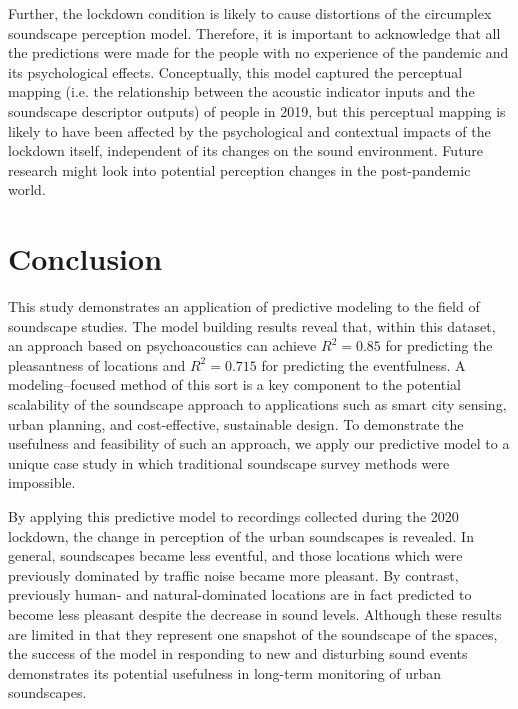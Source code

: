 Further, the lockdown condition is likely to cause distortions of the circumplex soundscape perception model. Therefore, it is important to acknowledge that all the predictions were made for the people with no experience of the pandemic and its psychological effects. Conceptually, this model captured the perceptual mapping (i.e. the relationship between the acoustic indicator inputs and the soundscape descriptor outputs) of people in 2019, but this perceptual mapping is likely to have been affected by the psychological and contextual impacts of the lockdown itself, independent of its changes on the sound environment. Future research might look into potential perception changes in the post-pandemic world.


\section{Conclusion}

This study demonstrates an application of predictive modeling to the field of soundscape studies. The model building results reveal that, within this dataset, an approach based on psychoacoustics can achieve $R^2 = 0.85$ for predicting the pleasantness of locations and $R^2 = 0.715$ for predicting the eventfulness. A modeling--focused method of this sort is a key component to the potential scalability of the soundscape approach to applications such as smart city sensing, urban planning, and cost-effective, sustainable design. To demonstrate the usefulness and feasibility of such an approach, we apply our predictive model to a unique case study in which traditional soundscape survey methods were impossible. 

By applying this predictive model to recordings collected during the 2020 lockdown, the change in perception of the urban soundscapes is revealed. In general, soundscapes became less eventful, and those locations which were previously dominated by traffic noise became more pleasant. By contrast, previously human- and natural-dominated locations are in fact predicted to become less pleasant despite the decrease in sound levels. Although these results are limited in that they represent one snapshot of the soundscape of the spaces, the success of the model in responding to new and disturbing sound events demonstrates its potential usefulness in long-term monitoring of urban soundscapes.

